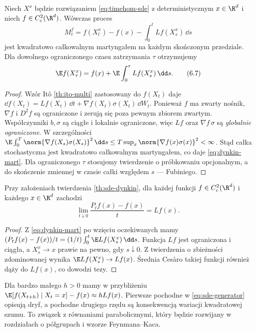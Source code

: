 \begin{twierdzenie}
\label{th:sde-dynkin}
Niech $X^x$ będzie rozwiązaniem \eqref{eq:timehom-sde}
z deterministycznym $x\in\R^d$ i niech
$f\in C_c^2(\R^d)$. Wówczas proces
\[
M_t^f=f(X_t^x)-f(x)-\int_0^tLf(X_s^x)\,\dd s
\tag{6.6}\label{eq:dynkin-mart}
\]
jest kwadratowo całkowalnym martyngałem na każdym
skończonym przedziale. Dla dowolnego ograniczonego
czasu zatrzymania $\tau$ otrzymujemy
\[
\E f(X_\tau^x)=f(x)+\E\int_0^\tau Lf(X_s^x)\,\dd s.
\tag{6.7}\label{eq:dynkin-optional}
\]
\end{twierdzenie}
\begin{proof}
Wzór Itô \ref{th:ito-multi} zastosowany do $f(X_t)$
daje
$\dd f(X_t)=Lf(X_t)\,\dd t+
\nabla f(X_t)\sigma(X_t)\,\dd W_t$.
Ponieważ $f$ ma zwarty nośnik, $\nabla f$ i
$D^2 f$ są ograniczone i zerują się poza pewnym
zbiorem zwartym. Współczynniki $b,\sigma$ są
ciągłe i lokalnie ograniczone, więc $Lf$ oraz
$\nabla f\,\sigma$ są \emph{globalnie ograniczone}.
W szczególności
$\E\int_0^T\norm{\nabla f(X_s)\sigma(X_s)}^2\,\dd s
\le T\sup_x\norm{\nabla f(x)\sigma(x)}^2<\infty$.
Stąd całka stochastyczna jest kwadratowo całkowalnym
martyngałem, co daje \eqref{eq:dynkin-mart}.
Dla ograniczonego $\tau$ stosujemy twierdzenie
o próbkowaniu opcjonalnym, a do skończenie zmiennej
w czasie całki względem $s$ — Fubiniego.
\end{proof}

\begin{wniosek}
\label{cor:sde-gen-limit}
Przy założeniach twierdzenia \ref{th:sde-dynkin},
dla każdej funkcji $f\in C_c^2(\R^d)$ i każdego
$x\in\R^d$ zachodzi
\[
\lim_{t\downarrow0}\frac{P_tf(x)-f(x)}{t}=Lf(x).
\tag{6.8}\label{eq:genlimit}
\]
\end{wniosek}
\begin{proof}
Z \eqref{eq:dynkin-mart} po wzięciu oczekiwanych mamy
$(P_tf(x)-f(x))/t=(1/t)\int_0^t\E Lf(X_s^x)\,\dd s$.
Funkcja $Lf$ jest ograniczona i ciągła, a
$X_s^x\to x$ prawie na pewno, gdy $s\downarrow0$.
Z twierdzenia o zbieżności zdominowanej wynika
$\E Lf(X_s^x)\to Lf(x)$.
Średnia Cesàro takiej funkcji również dąży do
$Lf(x)$, co dowodzi tezy.
\end{proof}

\begin{uwaga}
Dla bardzo małego $h>0$ mamy w przybliżeniu
$\E[f(X_{t+h})\mid X_t=x]-f(x)\approx hLf(x)$.
Pierwsze pochodne w \eqref{eq:sde-generator}
opisują dryf, a pochodne drugiego rzędu są
konsekwencją wariacji kwadratowej szumu.
To związek z równaniami parabolicznymi, który
będzie rozwijany w rozdziałach o półgrupach i
wzorze Feynmana--Kaca.
\end{uwaga}

